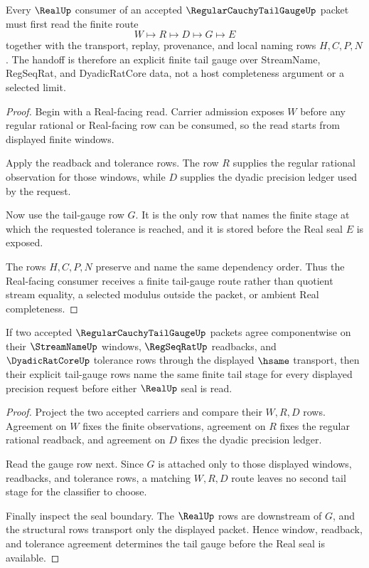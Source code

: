 \begin{theorem}
\label{thm:regular-cauchy-tail-gauge-real-seal-handoff}
Every $\RealUp$ consumer of an accepted $\RegularCauchyTailGaugeUp$ packet must first read the finite route
$$
W \longmapsto R \longmapsto D \longmapsto G \longmapsto E
$$
together with the transport, replay, provenance, and local naming rows $H,C,P,N$. The handoff is therefore an explicit finite tail gauge over StreamName, RegSeqRat, and DyadicRatCore data, not a host completeness argument or a selected limit.
\end{theorem}
\begin{proof}
Begin with a Real-facing read. Carrier admission exposes $W$ before any regular rational or Real-facing row can be consumed, so the read starts from displayed finite windows.

Apply the readback and tolerance rows. The row $R$ supplies the regular rational observation for those windows, while $D$ supplies the dyadic precision ledger used by the request.

Now use the tail-gauge row $G$. It is the only row that names the finite stage at which the requested tolerance is reached, and it is stored before the Real seal $E$ is exposed.

The rows $H,C,P,N$ preserve and name the same dependency order. Thus the Real-facing consumer receives a finite tail-gauge route rather than quotient stream equality, a selected modulus outside the packet, or ambient Real completeness.
\end{proof}

\begin{theorem}
\label{thm:regular-cauchy-tail-gauge-window-determinacy}
If two accepted $\RegularCauchyTailGaugeUp$ packets agree componentwise on their $\StreamNameUp$ windows, $\RegSeqRatUp$ readbacks, and $\DyadicRatCoreUp$ tolerance rows through the displayed $\hsame$ transport, then their explicit tail-gauge rows name the same finite tail stage for every displayed precision request before either $\RealUp$ seal is read.
\end{theorem}
\begin{proof}
Project the two accepted carriers and compare their $W,R,D$ rows. Agreement on $W$ fixes the finite observations, agreement on $R$ fixes the regular rational readback, and agreement on $D$ fixes the dyadic precision ledger.

Read the gauge row next. Since $G$ is attached only to those displayed windows, readbacks, and tolerance rows, a matching $W,R,D$ route leaves no second tail stage for the classifier to choose.

Finally inspect the seal boundary. The $\RealUp$ rows are downstream of $G$, and the structural rows transport only the displayed packet. Hence window, readback, and tolerance agreement determines the tail gauge before the Real seal is available.
\end{proof}

